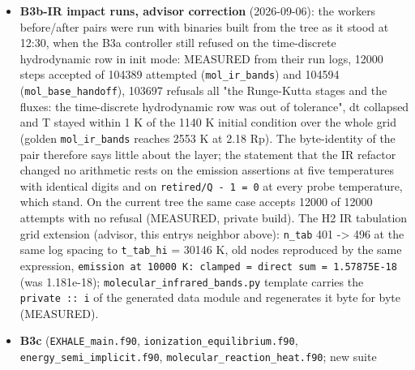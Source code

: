 \documentclass[english,a4paper]{my_memo}
\begin{document}
\begin{itemize}
  \textbf{ACCEPT-1/2} (user decisions 2026-09-06, items 1 and 2 of
  \texttt{To\_be\_determined\_by\_user\_20260906.md}, both as recommended; brief
  \texttt{plan\_rev2\_brief\_ACCEPT12.md}, to start when B3c releases
  \texttt{EXHALE\_main.f90}, \texttt{energy\_semi\_implicit.f90}, \texttt{ionization\_equilibrium.f90}):
  (1b) a failed energy update refuses the attempted step in both modes and
  the controller retakes it at half dt, exhaustion exits 2; (2a) the
  relaxation amnesty accepts a non-root only below a residual cap measured
  on the matrix, above it the cell keeps the composition it entered the
  sweep with (new acceptance class 6). Motivation: \texttt{oxygen\_chemistry} at its
  restated LW flux dies at step 0 on exactly this pair (LW-NORM-B
  verification entry above).
\item
  \textbf{B3b-IR impact runs, advisor correction} (2026-09-06): the worker\textquotesingle s
  before/after pairs were run with binaries built from the tree as it stood
  at 12:30, when the B3a controller still refused on the time-discrete
  hydrodynamic row in init mode: MEASURED from their run logs, 12000 steps
  accepted of 104389 attempted (\texttt{mol\_ir\_bands}) and 104594
  (\texttt{mol\_base\_handoff}), 103697 refusals all "the Runge-Kutta stages and the
  fluxes: the time-discrete hydrodynamic row was out of tolerance", dt
  collapsed and T stayed within 1 K of the 1140 K initial condition over the
  whole grid (golden \texttt{mol\_ir\_bands} reaches 2553 K at 2.18 Rp). The
  byte-identity of the pair therefore says little about the layer; the
  statement that the IR refactor changed no arithmetic rests on the emission
  assertions at five temperatures with identical digits and on
  \texttt{retired/Q\ -\ 1\ =\ 0} at every probe temperature, which stand. On the
  current tree the same case accepts 12000 of 12000 attempts with no
  refusal (MEASURED, private build). The H2 IR tabulation grid extension
  (advisor, this entry\textquotesingle s neighbor above): \texttt{n\_tab} 401 -\textgreater{} 496 at the same
  log spacing to \texttt{t\_tab\_hi} = 30146 K, old nodes reproduced by the same
  expression, \texttt{emission\ at\ 10000\ K:\ clamped\ =\ direct\ sum\ =\ 1.57875E-18}
  (was 1.181e-18); \texttt{molecular\_infrared\_bands.py} template carries the
  \texttt{private\ ::\ i} of the generated data module and regenerates it byte for
  byte (MEASURED).
\item
  \textbf{B3c} (\texttt{EXHALE\_main.f90}, \texttt{ionization\_equilibrium.f90},
  \texttt{energy\_semi\_implicit.f90}, \texttt{molecular\_reaction\_heat.f90}; new suite

\end{itemize}
\end{document}

